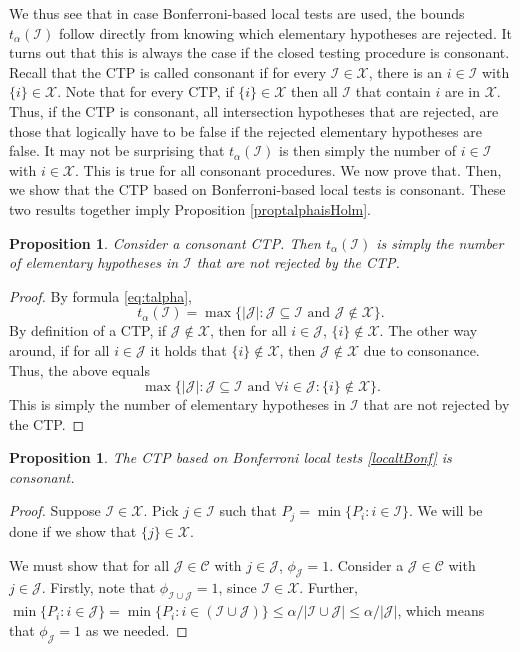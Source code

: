 \documentclass[11pt]{article}
\theoremstyle{plain}
\newtheorem{proposition}[theorem]{Proposition}
\theoremstyle{definition}
\newcommand{\K}{\mathcal{K}}
\newcommand{\I}{\mathcal{I}}
\newcommand{\J}{\mathcal{J}}
\newcommand{\X}{\mathcal{X}}
\newcommand{\C}{\mathcal{C}}
\begin{document}
We thus see that in case Bonferroni-based local tests are used, the bounds $t_{\alpha}(\I)$ follow directly from knowing which elementary hypotheses are rejected. It turns out that this is always the case if  the closed testing procedure is consonant. Recall that the CTP is called consonant if for every $\I\in \X$, there is an $i\in \I$ with $\{i\}\in \X$. 
Note that for every CTP, if $\{i\}\in \X$ then all $\I$ that contain $i$ are in $\X$. Thus, if the CTP is consonant, all intersection hypotheses that are rejected, are those that logically have to be false if the rejected elementary hypotheses are false. It may not be surprising that $t_{\alpha}(\I)$ is then simply the number of $i\in\I$ with $i\in \X$. This is true  for all consonant procedures.
We now prove that.
Then, we show that the CTP based on Bonferroni-based local tests is  consonant. These two results together imply  Proposition \ref{proptalphaisHolm}.



\begin{proposition} \label{boundscons}
Consider a consonant CTP. Then $t_{\alpha}(\I)$ is simply the number of elementary hypotheses in $\I$ that are not rejected by the CTP.
\end{proposition}
\begin{proof}
By   formula \eqref{eq:talpha},
$$t_{\alpha}(\I) = \max\{| \J|: \J\subseteq \I \text{ and }\J\not\in \X\}.$$
By definition of a CTP,  if $\J\not\in \X$, then for all $i\in \J$, $\{i\}\not\in \X$. The other way around, if for all $i\in \J$ it holds that $\{i\}\not\in \X$, then $\J\not\in \X$ due to consonance. Thus, the above equals 
$$\max\{|\J|: \J\subseteq \I \text{ and } \forall i\in \J:\{i\}\not\in \X\}.$$
This is simply the number of elementary hypotheses in $\I$ that are not rejected by the CTP.
\end{proof}



\begin{proposition} \label{Bonfcons}
The CTP based on Bonferroni local tests \eqref{localtBonf} is consonant.
\end{proposition}
\begin{proof}

Suppose $\I\in \X$.  
Pick $j\in \I$ such that $P_j=\min\{P_i:i\in \I\}$. We will be done if we show that $\{j\}\in \X$.


We must  show that for all  $\J\in \C$ with $j\in \J$, $\phi_{\J}=1$.
Consider  a $\J\in \C$ with $j\in \J$. Firstly,  note that $\phi_{\I\cup\J}=1$, since $\I\in\X$. 
Further, 
$\min\{P_i: i\in \J\} =\min\{P_i: i\in (\I\cup \J)\}  \leq \alpha /|\I\cup \J| \leq \alpha /| \J| $, which means that $\phi_{\J}=1$ as we needed.
\end{proof}
\end{document}
